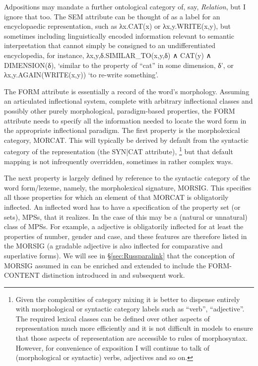 \documentclass[output=paper,
modfonts
]{LSP/langsci}
\begin{document}
Adpositions may mandate a further ontological category of, say, \textit{Relation}, but I ignore that too. The SEM attribute can be thought of as a label for an encyclopaedic representation, such as λx.CAT(x) or λx,y.WRITE(x,y), but sometimes including linguistically encoded information relevant to semantic interpretation that cannot simply be consigned to an undifferentiated encyclopedia, for instance, λx,y,δ.SIMILAR\_TO(x,y,δ) ∧  CAT(y) ∧ DIMENSION(δ), ‘similar to the property of ``cat'' in some dimension, δ’, or λx,y.AGAIN(WRITE(x,y)) `to re-write something’.


The FORM attribute is essentially a record of the word’s morphology. Assuming an articulated inflectional system, complete with arbitrary inflectional classes and possibly other purely morphological, paradigm-based properties, the FORM attribute needs to specify all the information needed to locate the word form in the appropriate inflectional paradigm. The first property is the morpholexical category, MORCAT. This will typically be derived by default from the syntactic category of the representation (the SYN|CAT attribute),%
\footnote{Given the complexities of category mixing it is better to dispense entirely with morphological or syntactic category labels such as  ``verb'', ``adjective''. The required lexical classes can be defined over other aspects of representation much more efficiently and it is not difficult in  models to ensure that those aspects of representation are accessible to rules of morphosyntax. However, for convenience of exposition I will continue to talk of (morphological or syntactic) verbs, adjectives and so on.}
but that default mapping is not infrequently overridden, sometimes in rather complex ways. 

The next property is largely defined by reference to the syntactic category of the word form/lexeme, namely, the morpholexical signature, MORSIG. This specifies all those  properties  for which an element of that MORCAT is obligatorily inflected. An inflected word has to have a specification of the  property set (or sets), MPSs, that it realizes. In the case of  this may be a (natural or unnatural) class of MPSs. %
For example, a  adjective is obligatorily inflected for at least the properties of number, gender and case, and these features are therefore listed in the MORSIG (a gradable adjective is also inflected for comparative and superlative forms). We will see in \S\ref{sec:Russparalink} that the conception of MORSIG assumed in \citet{Spencer13:book} can  be enriched and extended to include the FORM-CONTENT  distinction introduced in \citet{Stump06:heteroclisis} and subsequent work.
\end{document}
